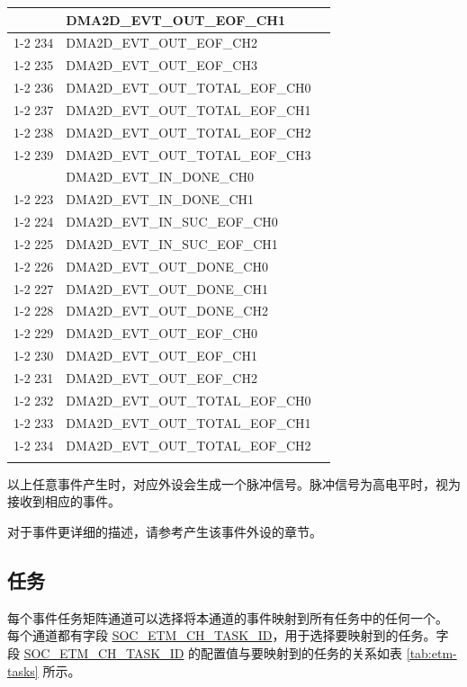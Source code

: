 \documentclass[main\_\_CN.tex]{subfiles}
\begin{document}
\begin{longtable}{ | l | l | l | }
{233 & DMA2D\_EVT\_OUT\_EOF\_CH1  & \\ \cline{1-2}
234 & DMA2D\_EVT\_OUT\_EOF\_CH2  & \\ \cline{1-2}
235 & DMA2D\_EVT\_OUT\_EOF\_CH3  & \\ \cline{1-2}
236 & DMA2D\_EVT\_OUT\_TOTAL\_EOF\_CH0  & \\ \cline{1-2}
237 & DMA2D\_EVT\_OUT\_TOTAL\_EOF\_CH1  & \\ \cline{1-2}
238 & DMA2D\_EVT\_OUT\_TOTAL\_EOF\_CH2  & \\ \cline{1-2}
239 & DMA2D\_EVT\_OUT\_TOTAL\_EOF\_CH3  & \\ \hline
}{%
222 & DMA2D\_EVT\_IN\_DONE\_CH0  & \nameref{mod:2ddma} \\ \cline{1-2}
223 & DMA2D\_EVT\_IN\_DONE\_CH1  & \\ \cline{1-2}
224 & DMA2D\_EVT\_IN\_SUC\_EOF\_CH0  & \\ \cline{1-2}
225 & DMA2D\_EVT\_IN\_SUC\_EOF\_CH1  & \\ \cline{1-2}
226 & DMA2D\_EVT\_OUT\_DONE\_CH0  & \\ \cline{1-2}
227 & DMA2D\_EVT\_OUT\_DONE\_CH1  & \\ \cline{1-2}
228 & DMA2D\_EVT\_OUT\_DONE\_CH2  & \\ \cline{1-2}
229 & DMA2D\_EVT\_OUT\_EOF\_CH0  & \\ \cline{1-2}
230 & DMA2D\_EVT\_OUT\_EOF\_CH1  & \\ \cline{1-2}
231 & DMA2D\_EVT\_OUT\_EOF\_CH2  & \\ \cline{1-2}
232 & DMA2D\_EVT\_OUT\_TOTAL\_EOF\_CH0  & \\ \cline{1-2}
233 & DMA2D\_EVT\_OUT\_TOTAL\_EOF\_CH1  & \\ \cline{1-2}
234 & DMA2D\_EVT\_OUT\_TOTAL\_EOF\_CH2  & \\ \hline
}
\end{longtable}

以上任意事件产生时，对应外设会生成一个脉冲信号。脉冲信号为高电平时，视为接收到相应的事件。

对于事件更详细的描述，请参考产生该事件外设的章节。

\subsection{任务}
\label{sec:evntaskmatrix-tasks}

每个事件任务矩阵通道可以选择将本通道的事件映射到所有任务中的任何一个。 每个通道都有字段 \hyperref[fielddesc:SOCETMCH0TASKID]{SOC\_ETM\_CH\_TASK\_ID}，用于选择要映射到的任务。字段 \hyperref[fielddesc:SOCETMCH0TASKID]{SOC\_ETM\_CH\_TASK\_ID} 的配置值与要映射到的任务的关系如表 \ref{tab:etm-tasks} 所示。
\end{document}
